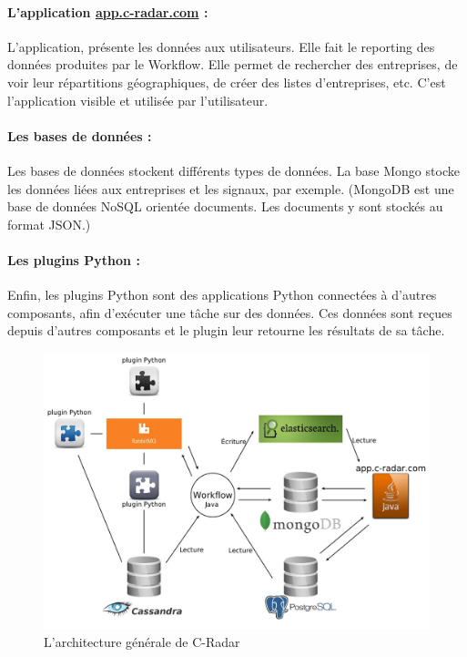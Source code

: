             \paragraph{L'application \href{app.c-radar.com}{app.c-radar.com} :}
                L'application, \og présente \fg les données aux utilisateurs. Elle fait le reporting des données produites par le Workflow. Elle permet de rechercher des entreprises, de voir leur répartitions géographiques, de créer des listes d'entreprises, etc. C'est l'application visible et utilisée par l'utilisateur.

            \paragraph{Les bases de données :}
                Les bases de données stockent différents types de données. La base Mongo stocke les données liées aux entreprises et les signaux, par exemple. (MongoDB est une base de données NoSQL orientée documents. Les documents y sont stockés au format JSON.)

            \paragraph{Les plugins Python :}
                Enfin, les plugins Python sont des applications Python connectées à d'autres composants, afin d'exécuter une tâche sur des données. Ces données sont reçues depuis d'autres composants et le plugin leur retourne les résultats de sa tâche.

            \color{black}


            \begin{figure}[h!]
                \centering
                \includegraphics[width=\textwidth]{images/archi.jpg}
                \caption{L'architecture générale de C-Radar}
                \label{fig:archi}
            \end{figure}